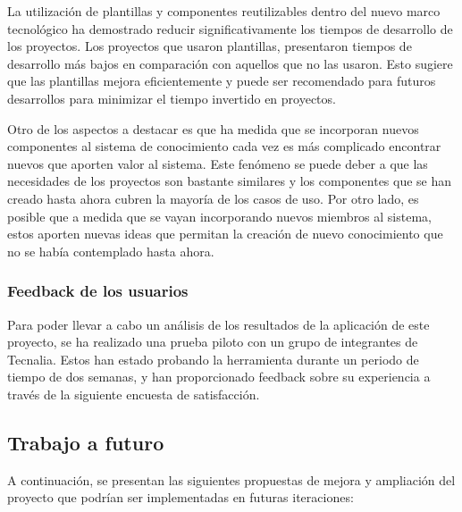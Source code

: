 La utilización de plantillas y componentes reutilizables dentro del nuevo 
marco tecnológico ha demostrado reducir significativamente los tiempos de 
desarrollo de los proyectos. Los proyectos que usaron plantillas, 
presentaron tiempos de desarrollo más bajos en comparación con aquellos que no 
las usaron. Esto sugiere que las plantillas mejora eficientemente y puede ser 
recomendado para futuros desarrollos para minimizar el tiempo invertido en proyectos.\medskip

Otro de los aspectos a destacar es que ha medida que se incorporan nuevos componentes 
al sistema de conocimiento cada vez es más complicado encontrar nuevos que aporten
valor al sistema. Este fenómeno se puede deber a que las necesidades de los proyectos
son bastante similares y los componentes que se han creado hasta ahora cubren la mayoría
de los casos de uso. Por otro lado, es posible que a medida que se vayan incorporando
nuevos miembros al sistema, estos aporten nuevas ideas que permitan la creación de nuevo
conocimiento que no se había contemplado hasta ahora.

\subsubsection{Feedback de los usuarios}
Para poder llevar a cabo un análisis de los resultados de la aplicación
de este proyecto, se ha realizado una prueba piloto con un grupo de integrantes
de Tecnalia. Estos han estado probando la herramienta durante un periodo de tiempo
de dos semanas, y han proporcionado feedback sobre su experiencia a través de
la siguiente encuesta de satisfacción. 

\subsection{Trabajo a futuro}
A continuación, se presentan las siguientes propuestas de mejora y ampliación
del proyecto que podrían ser implementadas en futuras iteraciones:

